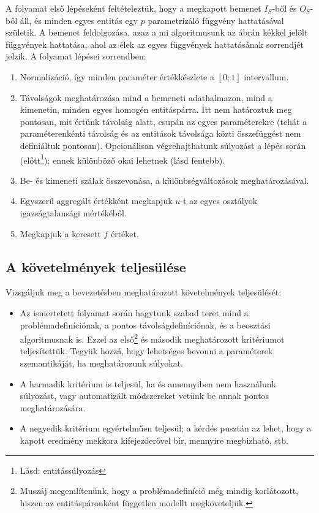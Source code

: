 \documentclass[twocolumn]{article}
\theoremstyle{definition}
\begin{document}
    A folyamat első lépéseként feltételeztük, hogy a megkapott bemenet $I_S$-ből és $O_S$-ből áll, és minden egyes entitás egy $p$ parametrizáló függvény hattatásával születik. A bemenet feldolgozása, azaz a mi algoritmusunk az ábrán kékkel jelölt függvények hattatása, ahol az élek az egyes függvények hattatásának sorrendjét jelzik. A folyamat lépései sorrendben:
    \begin{enumerate}
        \item Normalizáció, így minden paraméter értékkészlete a $[0; 1]$ intervallum.
        \item Távolságok meghatározása mind a bemeneti adathalmazon, mind a kimenetin, minden egyes homogén entitáspárra. Itt nem határoztuk meg pontosan, mit értünk távolság alatt, csupán az egyes paraméterekre (tehát a paraméterenkénti távolság és az entitások távolsága közti összefüggést nem definiáltuk pontosan).
        Opcionálisan végrehajthatunk súlyozást a lépés során (előtt\footnote{Lásd: entitássúlyozás}); ennek különböző okai lehetnek (lásd fentebb).
        \item Be- és kimeneti szálak összevonása, a különbségváltozások meghatározásával.
        \item Egyszerű aggregált értékként megkapjuk $u$-t az egyes osztályok igazságtalansági mértékéből.
        \item Megkapjuk a keresett $f$ értéket.
    \end{enumerate}

    \subsection{A követelmények teljesülése}
    
    Vizsgáljuk meg a bevezetésben meghatározott követelmények teljesülését:
    
    \begin{itemize}
        \item[1-2.] Az ismertetett folyamat során hagytunk szabad teret mind a problémadefiníciónak, a pontos távolságdefiníciónak, és a beosztási algoritmusnak is. Ezzel az első\footnote{Muszáj megemlítenünk, hogy a problémadefiníció még mindig korlátozott, hiszen az entitáspáronként független modellt megköveteljük.} és második meghatározott kritériumot teljesítettük. Tegyük hozzá, hogy lehetséges bevonni a paraméterek szemantikáját, ha meghatározunk súlyokat.
    
        \item[3.] A harmadik kritérium is teljesül, ha és amennyiben nem használunk súlyozást, vagy automatizált módszereket vetünk be annak pontos meghatározására.
    
        \item[4.] A negyedik kritérium egyértelműen teljesül; a kérdés pusztán az lehet, hogy a kapott eredmény mekkora kifejezőerővel bír, mennyire megbizható, stb.
    \end{itemize}
    
\end{document}
